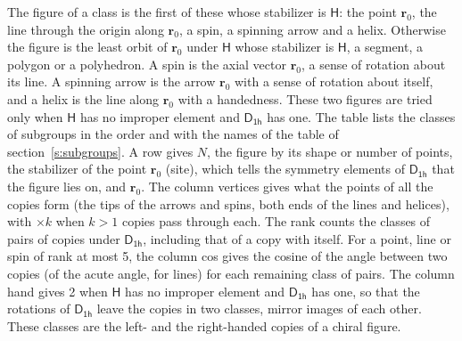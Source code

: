\documentclass[10pt,a4paper]{article}
\numberwithin{equation}{section}
\newcommand{\grp}[1]{\mathsf{#1}}
\newcommand{\pointr}{\mathbf{r}}
\begin{document}
\leavevmode\label{n:head.figure}The figure of a class is the first of these whose stabilizer is $\grp{H}$: the point $\pointr_0$, the line through the origin along $\pointr_0$, a spin, a spinning arrow and a helix. Otherwise the figure is the least orbit of $\pointr_0$ under $\grp{H}$ whose stabilizer is $\grp{H}$, a segment, a polygon or a polyhedron. A spin is the axial vector $\pointr_0$, a sense of rotation about its line. A spinning arrow is the arrow $\pointr_0$ with a sense of rotation about itself, and a helix is the line along $\pointr_0$ with a handedness. These two figures are tried only when $\grp{H}$ has no improper element and $\grp{D_{1h}}$ has one. The table lists the classes of subgroups in the order and with the names of the table of section~\ref{s:subgroups}. \label{n:head.site}A row gives $N$, the figure by its shape or number of points, the stabilizer of the point $\pointr_0$ (site), which tells the symmetry elements of $\grp{D_{1h}}$ that the figure lies on, and $\pointr_0$. \label{n:head.vertices}The column vertices gives what the points of all the copies form (the tips of the arrows and spins, both ends of the lines and helices), with ${\times}k$ when $k > 1$ copies pass through each. \label{n:head.rank}The rank counts the classes of pairs of copies under $\grp{D_{1h}}$, including that of a copy with itself. \label{n:head.cos}For a point, line or spin of rank at most 5, the column cos gives the cosine of the angle between two copies (of the acute angle, for lines) for each remaining class of pairs. \label{n:head.hand}The column hand gives 2 when $\grp{H}$ has no improper element and $\grp{D_{1h}}$ has one, so that the rotations of $\grp{D_{1h}}$ leave the copies in two classes, mirror images of each other. These classes are the left- and the right-handed copies of a chiral figure.
\end{document}
